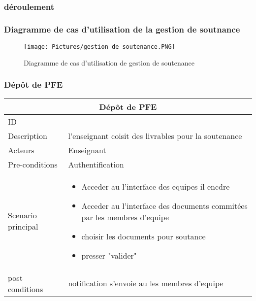 \documentclass[11pt,fleqn]{book} %
\begin{document}
\subsubsection{déroulement}
\subsubsection{Diagramme de cas d’utilisation de la gestion 
de soutnance}

\begin{figure}[h]
    \centering
    \texttt{[image: Pictures/gestion de soutenance.PNG]}
    \caption{Diagramme de cas d'utilisation de gestion de soutenance}
    \label{fig:pca}
\end{figure}
\subsubsection{Dépôt  de PFE}
\begin{center}
\begin{tabularx}{1\textwidth} { | p{4cm} | >{\raggedright\arraybackslash}X |  }
  \hline
  \multicolumn{2}{|c|}{Dépôt de PFE} \\
 \hline
 ID & 1  \\
 \hline
 Description  & l'enseignant coisit des livrables pour la soutenance   \\
  \hline
 Acteurs  & Enseignant   \\
  \hline
 Pre-conditions  & Authentification\\
 \hline
 Scenario principal  &  
 \begin{itemize}
     \item  Acceder au l'interface des equipes il encdre 
     \item  Acceder au l'interface des documents commitées par les membres d'equipe
     \item choisir les documents pour soutance
     \item presser "valider" 
     
 \end{itemize}\\
  \hline
 post conditions  & notification s'envoie au les membres d'equipe  \\
  \hline
\end{tabularx}
\label{tbl:nicetablelesstable}
\end{center}
\end{document}
